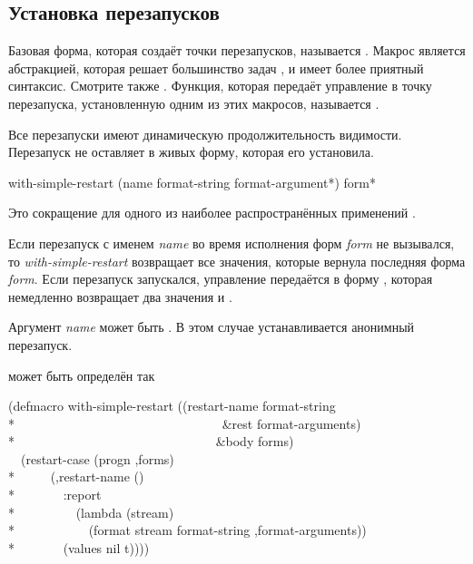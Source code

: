 \subsection{Установка перезапусков}

Базовая форма, которая создаёт точки перезапусков, называется
.  Макрос  является абстракцией, которая
решает большинство задач , и имеет более приятный
синтаксис. Смотрите также .  Функция, которая
передаёт управление в точку перезапуска, установленную одним из этих макросов,
называется .

Все перезапуски имеют динамическую продолжительность видимости. Перезапуск не
оставляет в живых форму, которая его установила.

\begin{defmac}
with-simple-restart (name format-string {format-argument}*)
                    {form}*

Это сокращение для одного из наиболее распространённых применений
.

Если перезапуск с именем \emph{name} во время исполнения форм \emph{form} не
вызывался, то \emph{with-simple-restart} возвращает все значения, которые
вернула последняя форма \emph{form}. Если перезапуск запускался, управление
передаётся в форму , которая немедленно возвращает
два значения  и .

Аргумент \emph{name} может быть . В этом случае устанавливается
анонимный перезапуск.

 может быть определён так
\begin{lisp}
(defmacro with-simple-restart ((restart-name format-string \\*
~~~~~~~~~~~~~~~~~~~~~~~~~~~~~~~~\&rest format-arguments) \\*
~~~~~~~~~~~~~~~~~~~~~~~~~~~~~~~\&body forms) \\
~~{\Xbq}(restart-case (progn ,{\Xatsign}forms) \\*
~~~~~(,restart-name () \\*
~~~~~~~:report \\*
~~~~~~~~~(lambda (stream) \\*
~~~~~~~~~~~(format stream format-string ,{\Xatsign}format-arguments)) \\*
~~~~~~~(values nil t))))
\end{lisp}


\end{defmac}
